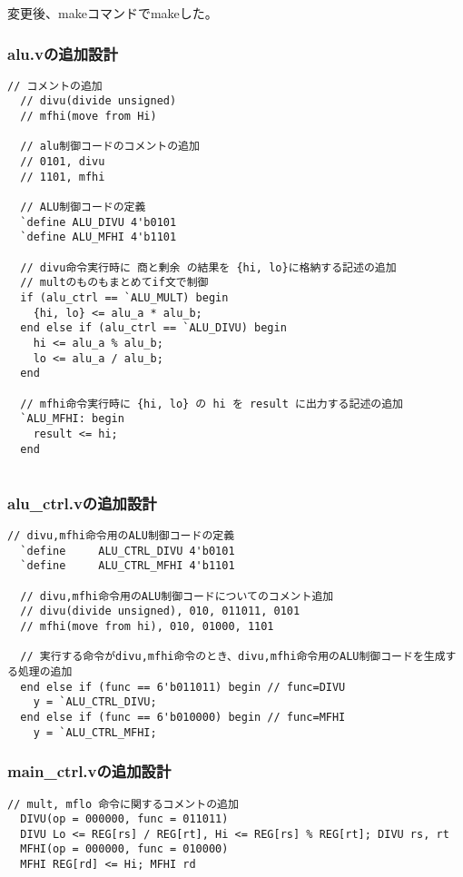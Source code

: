 変更後、makeコマンドでmakeした。

\subsubsection{alu.vの追加設計}
\begin{lstlisting}[caption={alu.vの変更},label={alu.vの変更10}]
  // コメントの追加
  // divu(divide unsigned)
  // mfhi(move from Hi)
  
  // alu制御コードのコメントの追加
  // 0101, divu
  // 1101, mfhi
  
  // ALU制御コードの定義
  `define ALU_DIVU 4'b0101
  `define ALU_MFHI 4'b1101
  
  // divu命令実行時に 商と剰余 の結果を {hi, lo}に格納する記述の追加
  // multのものもまとめてif文で制御
  if (alu_ctrl == `ALU_MULT) begin
    {hi, lo} <= alu_a * alu_b;
  end else if (alu_ctrl == `ALU_DIVU) begin
    hi <= alu_a % alu_b;
    lo <= alu_a / alu_b;
  end

  // mfhi命令実行時に {hi, lo} の hi を result に出力する記述の追加
  `ALU_MFHI: begin
    result <= hi;
  end
  
\end{lstlisting}

\subsubsection{alu\_ctrl.vの追加設計}
\begin{lstlisting}[caption={alu\_ctrl.v},label={aluctrl.v10}]
  // divu,mfhi命令用のALU制御コードの定義
  `define     ALU_CTRL_DIVU 4'b0101
  `define     ALU_CTRL_MFHI 4'b1101
  
  // divu,mfhi命令用のALU制御コードについてのコメント追加
  // divu(divide unsigned), 010, 011011, 0101
  // mfhi(move from hi), 010, 01000, 1101
  
  // 実行する命令がdivu,mfhi命令のとき、divu,mfhi命令用のALU制御コードを生成する処理の追加
  end else if (func == 6'b011011) begin // func=DIVU
    y = `ALU_CTRL_DIVU;
  end else if (func == 6'b010000) begin // func=MFHI
    y = `ALU_CTRL_MFHI;
\end{lstlisting}

\subsubsection{main\_ctrl.vの追加設計}
\begin{lstlisting}[caption={main\_ctri.vの変更},label={mainctri.vの変更10}]
  // mult, mflo 命令に関するコメントの追加
  DIVU(op = 000000, func = 011011)
  DIVU Lo <= REG[rs] / REG[rt], Hi <= REG[rs] % REG[rt]; DIVU rs, rt
  MFHI(op = 000000, func = 010000)
  MFHI REG[rd] <= Hi; MFHI rd
\end{lstlisting}


